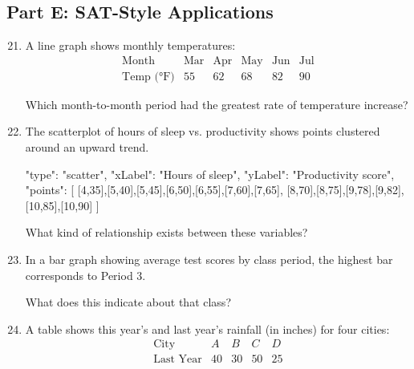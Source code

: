 \documentclass[14pt]{extarticle}
\begin{document}
\subsection*{Part E: SAT-Style Applications}
\begin{enumerate}
  \setcounter{enumi}{20}
  \item A line graph shows monthly temperatures:
  \[
  \begin{array}{c|ccccc}
  \text{Month} & \text{Mar} & \text{Apr} & \text{May} & \text{Jun} & \text{Jul}\\ \hline
  \text{Temp (°F)} & 55 & 62 & 68 & 82 & 90
  \end{array}
  \]
  Which month-to-month period had the greatest rate of temperature increase?
  \item The scatterplot of hours of sleep vs. productivity shows points clustered around an upward trend.
  \begin{diagramdata}
  {
    "type": "scatter",
    "xLabel": "Hours of sleep",
    "yLabel": "Productivity score",
    "points": [
      [4,35],[5,40],[5,45],[6,50],[6,55],[7,60],[7,65],
      [8,70],[8,75],[9,78],[9,82],[10,85],[10,90]
    ]
  }
  \end{diagramdata}
  What kind of relationship exists between these variables?
  \item In a bar graph showing average test scores by class period, the highest bar corresponds to Period 3.
  What does this indicate about that class?
  \item A table shows this year's and last year's rainfall (in inches) for four cities:
  \[
  \begin{array}{c|cccc}
  \text{City} & A & B & C & D\\ \hline
  \text{Last Year} & 40 & 30 & 50 & 25\\

\end{array}\]
\end{enumerate}
\end{document}
